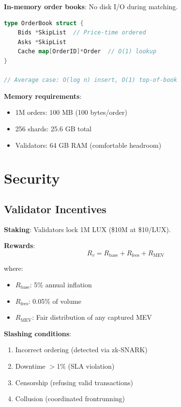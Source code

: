 \documentclass[11pt,letterpaper]{article}
\begin{document}
\textbf{In-memory order books}: No disk I/O during matching.

\begin{lstlisting}[language=Go]
type OrderBook struct {
    Bids *SkipList  // Price-time ordered
    Asks *SkipList
    Cache map[OrderID]*Order  // O(1) lookup
}

// Average case: O(log n) insert, O(1) top-of-book
\end{lstlisting}

\textbf{Memory requirements}:
\begin{itemize}
    \item 1M orders: 100 MB (100 bytes/order)
    \item 256 shards: 25.6 GB total
    \item Validators: 64 GB RAM (comfortable headroom)
\end{itemize}

\section{Security}

\subsection{Validator Incentives}

\textbf{Staking}: Validators lock 1M LUX (\$10M at \$10/LUX).

\textbf{Rewards}:
\begin{equation}
R_v = R_{\text{base}} + R_{\text{fees}} + R_{\text{MEV}}
\end{equation}

where:
\begin{itemize}
    \item $R_{\text{base}}$: 5\% annual inflation
    \item $R_{\text{fees}}$: 0.05\% of volume
    \item $R_{\text{MEV}}$: Fair distribution of any captured MEV
\end{itemize}

\textbf{Slashing conditions}:
\begin{enumerate}
    \item Incorrect ordering (detected via zk-SNARK)
    \item Downtime $>$1\% (SLA violation)
    \item Censorship (refusing valid transactions)
    \item Collusion (coordinated frontrunning)
\end{enumerate}
\end{document}

